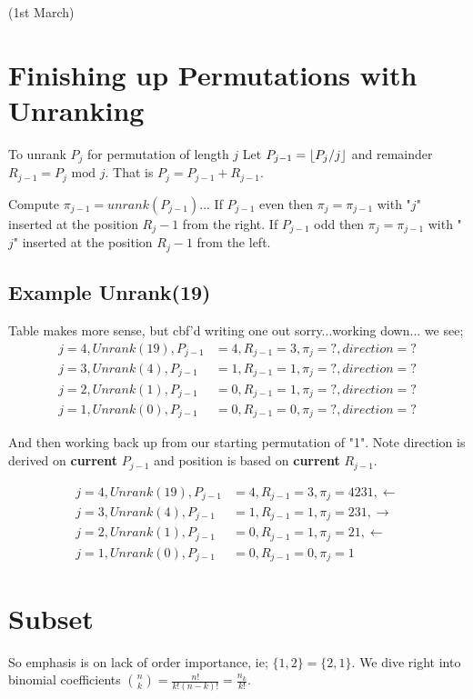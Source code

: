 \documentclass{article}
\DeclarePairedDelimiter\floor{\lfloor}{\rfloor}
\begin{document}
(1st March)
\section*{Finishing up Permutations with Unranking}
To unrank $P_j$ for permutation of length $j$ Let $P_{j-1} = \floor*{P_j/j}$ and remainder $R_{j-1} = P_j \text{ mod } j$. That is $P_j = P_{j-1}+R_{j-1}$.

Compute $\pi_{j-1} =  unrank(P_{j-1})$... 
If $P_{j-1}$ even then $\pi_j = \pi_{j-1}$ with "$j$" inserted at the position $R_j-1$ from the right.
If $P_{j-1}$ odd then $\pi_j = \pi_{j-1}$ with "$j$" inserted at the position $R_j-1$ from the left.

\subsection*{Example Unrank(19)}
Table makes more sense, but cbf'd writing one out sorry...working down... we see;
\begin{align}
j=4, Unrank(19),P_{j-1} &= 4 , R_{j-1} = 3,\pi_j = ?, direction = ?\\
j=3, Unrank(4), P_{j-1} &= 1 , R_{j-1} = 1,\pi_j = ?, direction = ?\\
j=2, Unrank(1), P_{j-1} &= 0 , R_{j-1} = 1,\pi_j = ?, direction = ?\\
j=1, Unrank(0), P_{j-1} &= 0 , R_{j-1} = 0,\pi_j = ?, direction = ?
\end{align}

And then working back up from our starting permutation of "1". Note direction is derived on {\bf current} $P_{j-1}$ and position is based on {\bf current} $R_{j-1}$.

\begin{align}
j=4, Unrank(19),P_{j-1} &= 4 , R_{j-1} = 3,\pi_j = 4231, \leftarrow\\
j=3, Unrank(4), P_{j-1} &= 1 , R_{j-1} = 1,\pi_j = 231, \rightarrow \\
j=2, Unrank(1), P_{j-1} &= 0 , R_{j-1} = 1,\pi_j = 21, \leftarrow\\
j=1, Unrank(0), P_{j-1} &= 0 , R_{j-1} = 0,\pi_j = 1
\end{align}

\section*{Subset}
So emphasis is on lack of order importance, ie; $\{1, 2\} = \{2, 1\}$. We dive right into binomial coefficients $\binom{n}{k} = \frac{n!}{k!(n-k)!} = \frac{n_k}{k!}$.
\end{document}
